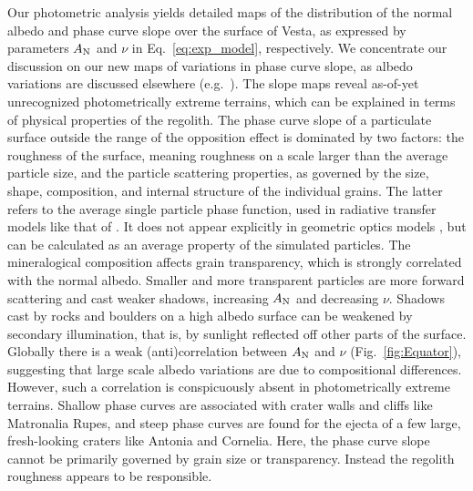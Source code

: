 \documentclass[3p,authoryear]{elsarticle}
\begin{document}
Our photometric analysis yields detailed maps of the distribution of the normal albedo and phase curve slope over the surface of Vesta, as expressed by parameters $A_{\rm N}$ and $\nu$ in Eq.~\ref{eq:exp_model}, respectively. We concentrate our discussion on our new maps of variations in phase curve slope, as albedo variations are discussed elsewhere (e.g.\ \citealt{McC12}). The slope maps reveal as-of-yet unrecognized photometrically extreme terrains, which can be explained in terms of physical properties of the regolith. The phase curve slope of a particulate surface outside the range of the opposition effect is dominated by two factors: the roughness of the surface, meaning roughness on a scale larger than the average particle size, and the particle scattering properties, as governed by the size, shape, composition, and internal structure of the individual grains. The latter refers to the average single particle phase function, used in radiative transfer models like that of \citet{H81}. It does not appear explicitly in geometric optics models \citep{GS08}, but can be calculated as an average property of the simulated particles. The mineralogical composition affects grain transparency, which is strongly correlated with the normal albedo. Smaller and more transparent particles are more forward scattering and cast weaker shadows, increasing $A_{\rm N}$ and decreasing $\nu$. Shadows cast by rocks and boulders on a high albedo surface can be weakened by secondary illumination, that is, by sunlight reflected off other parts of the surface. Globally there is a weak (anti)correlation between $A_{\rm N}$ and $\nu$ (Fig.~\ref{fig:Equator}), suggesting that large scale albedo variations are due to compositional differences. However, such a correlation is conspicuously absent in photometrically extreme terrains. Shallow phase curves are associated with crater walls and cliffs like Matronalia Rupes, and steep phase curves are found for the ejecta of a few large, fresh-looking craters like Antonia and Cornelia. Here, the phase curve slope cannot be primarily governed by grain size or transparency. Instead the regolith roughness appears to be responsible.
\end{document}
